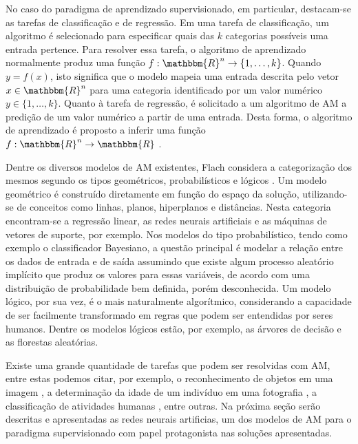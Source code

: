 No caso do paradigma de aprendizado supervisionado, em particular, destacam-se as tarefas de classificação e de regressão. Em uma tarefa de classificação, um algoritmo é selecionado para especificar quais das $k$ categorias possíveis uma entrada pertence. Para resolver essa tarefa, o algoritmo de aprendizado normalmente produz uma função $f : \mathbbm{R}^n \rightarrow \{1, \ldots, k\}$. Quando $y = f(x)$, isto significa que o modelo mapeia uma entrada descrita pelo vetor $x \in \mathbbm{R}^n$ para uma categoria identificado por um valor numérico $y \in \{1, \ldots, k\} $. Quanto à tarefa de regressão, é solicitado a um algoritmo de AM a predição de um valor numérico a partir de uma entrada. Desta forma, o algoritmo de aprendizado é proposto a inferir uma função $f : \mathbbm{R}^n \rightarrow \mathbbm{R}$ \cite{goodfellow}.


Dentre os diversos modelos de AM existentes, Flach considera a categorização dos mesmos segundo os tipos geométricos, probabilísticos e lógicos \cite{flach}. Um modelo geométrico é construído diretamente em função do espaço da solução, utilizando-se de conceitos como linhas, planos, hiperplanos e distâncias. Nesta categoria encontram-se a regressão linear, as redes neurais artificiais e as máquinas de vetores de suporte, por exemplo. Nos modelos do tipo probabilístico, tendo como exemplo o classificador Bayesiano, a questão principal é modelar a relação entre os dados de entrada e de saída assumindo que existe algum processo aleatório implícito que produz os valores para essas variáveis, de acordo com uma distribuição de probabilidade bem definida, porém desconhecida. Um modelo lógico, por sua vez, é o mais naturalmente algorítmico, considerando a capacidade de ser facilmente transformado em regras que podem ser entendidas por seres humanos. Dentre os modelos lógicos estão, por exemplo, as árvores de decisão e as florestas aleatórias.


Existe uma grande quantidade de tarefas que podem ser resolvidas com AM, entre estas podemos citar, por exemplo, o reconhecimento de objetos em uma imagem \cite{pathak}, a determinação da idade de um indivíduo em uma fotografia \cite{nicoli-tcc}, a classificação de atividades humanas \cite{lira}, entre outras. Na próxima seção serão descritas e apresentadas as redes neurais artificias, um dos modelos de AM para o paradigma supervisionado com papel protagonista nas soluções apresentadas.


